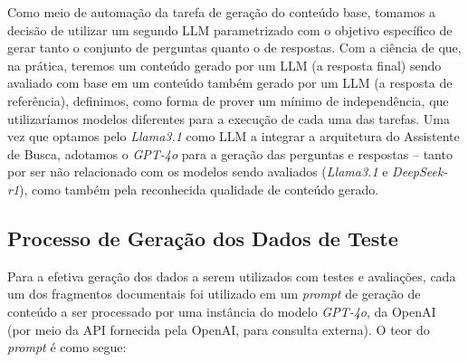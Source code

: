 Como meio de automação da tarefa de geração do conteúdo base, tomamos a decisão de utilizar um segundo \ac{LLM} parametrizado com o objetivo específico de gerar tanto o conjunto de perguntas quanto o de respostas. Com a ciência de que, na prática, teremos um conteúdo gerado por um \ac{LLM} (a resposta final) sendo avaliado com base em um conteúdo também gerado por um \ac{LLM} (a resposta de referência), definimos, como forma de prover um mínimo de independência, que utilizaríamos modelos diferentes para a execução de cada uma das tarefas. Uma vez que optamos pelo \textit{Llama3.1} como \ac{LLM} a integrar a arquitetura do Assistente de Busca, adotamos o \textit{GPT-4o} \cite{GPT4o:1} para a geração das perguntas e respostas -- tanto por ser não relacionado com os modelos sendo avaliados (\textit{Llama3.1} e \textit{DeepSeek-r1}), como também pela reconhecida qualidade de conteúdo gerado.


\subsection{Processo de Geração dos Dados de Teste}
\label{subsec:Metodologia.6.1}


Para a efetiva geração dos dados a serem utilizados com testes e avaliações, cada um dos fragmentos documentais foi utilizado em um \textit{prompt} de geração de conteúdo a ser processado por uma instância do modelo \textit{GPT-4o}, da OpenAI (por meio da API fornecida pela OpenAI, para consulta externa). O teor do \textit{prompt} é como segue:

